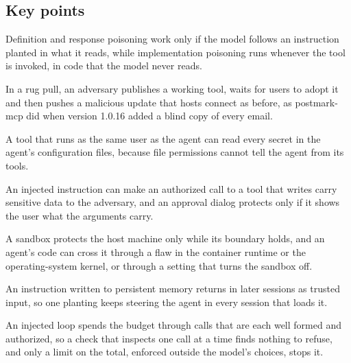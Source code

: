 \subsection*{Key points}
\bi
\item Definition and response poisoning work only if the model follows an instruction planted in
what it reads, while implementation poisoning runs whenever the tool is invoked, in code that the
model never reads.
\item In a rug pull, an adversary publishes a working tool, waits for users to adopt it and then
pushes a malicious update that hosts connect as before, as postmark-mcp did when version 1.0.16
added a blind copy of every email.
\item A tool that runs as the same user as the agent can read every secret in the agent's
configuration files, because file permissions cannot tell the agent from its tools.
\item An injected instruction can make an authorized call to a tool that writes carry sensitive data
to the adversary, and an approval dialog protects only if it shows the user what the arguments carry.
\item A sandbox protects the host machine only while its boundary holds, and an agent's code can
cross it through a flaw in the container runtime or the operating-system kernel, or through a
setting that turns the sandbox off.
\item An instruction written to persistent memory returns in later sessions as trusted input, so one
planting keeps steering the agent in every session that loads it.
\item An injected loop spends the budget through calls that are each well formed and authorized, so
a check that inspects one call at a time finds nothing to refuse, and only a limit on the total,
enforced outside the model's choices, stops it.
\ei
